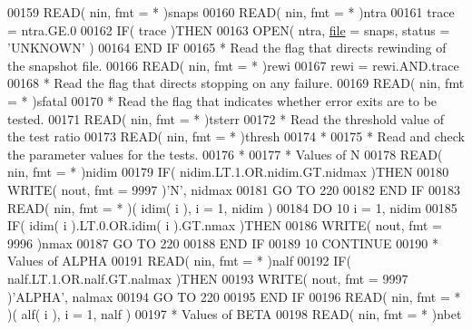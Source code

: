 \begin{DoxyCode}
00159       \textcolor{keyword}{READ}( nin, fmt = * )snaps
00160       \textcolor{keyword}{READ}( nin, fmt = * )ntra
00161       trace = ntra.GE.0
00162       \textcolor{keywordflow}{IF}( trace )\textcolor{keywordflow}{THEN}
00163          \textcolor{keyword}{OPEN}( ntra, \hyperlink{structfile}{file} = snaps, status = \textcolor{stringliteral}{'UNKNOWN'} )
00164 \textcolor{keywordflow}{      END IF}
00165 \textcolor{comment}{*     Read the flag that directs rewinding of the snapshot file.}
00166       \textcolor{keyword}{READ}( nin, fmt = * )rewi
00167       rewi = rewi.AND.trace
00168 \textcolor{comment}{*     Read the flag that directs stopping on any failure.}
00169       \textcolor{keyword}{READ}( nin, fmt = * )sfatal
00170 \textcolor{comment}{*     Read the flag that indicates whether error exits are to be tested.}
00171       \textcolor{keyword}{READ}( nin, fmt = * )tsterr
00172 \textcolor{comment}{*     Read the threshold value of the test ratio}
00173       \textcolor{keyword}{READ}( nin, fmt = * )thresh
00174 \textcolor{comment}{*}
00175 \textcolor{comment}{*     Read and check the parameter values for the tests.}
00176 \textcolor{comment}{*}
00177 \textcolor{comment}{*     Values of N}
00178       \textcolor{keyword}{READ}( nin, fmt = * )nidim
00179       \textcolor{keywordflow}{IF}( nidim.LT.1.OR.nidim.GT.nidmax )\textcolor{keywordflow}{THEN}
00180          \textcolor{keyword}{WRITE}( nout, fmt = 9997 )\textcolor{stringliteral}{'N'}, nidmax
00181          \textcolor{keywordflow}{GO TO} 220
00182 \textcolor{keywordflow}{      END IF}
00183       \textcolor{keyword}{READ}( nin, fmt = * )( idim( i ), i = 1, nidim )
00184       \textcolor{keywordflow}{DO} 10 i = 1, nidim
00185          \textcolor{keywordflow}{IF}( idim( i ).LT.0.OR.idim( i ).GT.nmax )\textcolor{keywordflow}{THEN}
00186             \textcolor{keyword}{WRITE}( nout, fmt = 9996 )nmax
00187             \textcolor{keywordflow}{GO TO} 220
00188 \textcolor{keywordflow}{         END IF}
00189    10 \textcolor{keywordflow}{CONTINUE}
00190 \textcolor{comment}{*     Values of ALPHA}
00191       \textcolor{keyword}{READ}( nin, fmt = * )nalf
00192       \textcolor{keywordflow}{IF}( nalf.LT.1.OR.nalf.GT.nalmax )\textcolor{keywordflow}{THEN}
00193          \textcolor{keyword}{WRITE}( nout, fmt = 9997 )\textcolor{stringliteral}{'ALPHA'}, nalmax
00194          \textcolor{keywordflow}{GO TO} 220
00195 \textcolor{keywordflow}{      END IF}
00196       \textcolor{keyword}{READ}( nin, fmt = * )( alf( i ), i = 1, nalf )
00197 \textcolor{comment}{*     Values of BETA}
00198       \textcolor{keyword}{READ}( nin, fmt = * )nbet

\end{DoxyCode}
